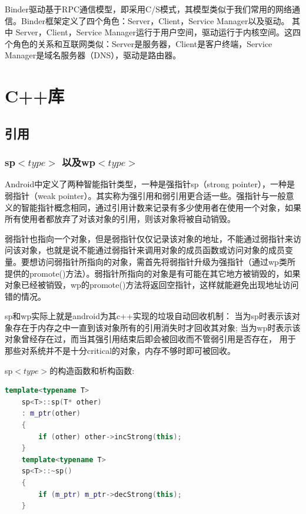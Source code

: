 \documentclass[a4paper,11pt]{article}
\begin{document}
\begin{CJK*}{UTF8}{gbsn}
    Binder驱动基于RPC通信模型，即采用C/S模式，其模型类似于我们常用的网络通信。Binder框架定义了四个角色：Server，Client，Service Manager以及驱动。
    其中 Server，Client，Service Manager运行于用户空间，驱动运行于内核空间。这四个角色的关系和互联网类似：Server是服务器，Client是客户终端，Service Manager是域名服务器（DNS），驱动是路由器。

\section{C++库}
    \subsection{引用}
    \subsubsection{sp$<type>$ 以及wp$<type>$}
    Android中定义了两种智能指针类型，一种是强指针sp（strong pointer），一种是弱指针（weak pointer）。其实称为强引用和弱引用更合适一些。强指针与一般意义的智能指针概念相同，通过引用计数来记录有多少使用者在使用一个对象，如果所有使用者都放弃了对该对象的引用，则该对象将被自动销毁。

    弱指针也指向一个对象，但是弱指针仅仅记录该对象的地址，不能通过弱指针来访问该对象，也就是说不能通过弱指针来调用对象的成员函数或访问对象的成员变量。要想访问弱指针所指向的对象，需首先将弱指针升级为强指针（通过wp类所提供的promote()方法）。弱指针所指向的对象是有可能在其它地方被销毁的，如果对象已经被销毁，wp的promote()方法将返回空指针，这样就能避免出现地址访问错的情况。

    sp和wp实际上就是android为其c++实现的垃圾自动回收机制：%
    当为sp时表示该对象存在于内存之中一直到该对象所有的引用消失时才回收其对象;%
    当为wp时表示该对象曾经存在过，而当其强引用结束后即会被回收而不管弱引用是否存在，%
    用于那些对系统并不是十分critical的对象，内存不够时即可被回收。

    sp$<type>$的构造函数和析构函数:\\
    \begin{lstlisting}[language=C++]
    template<typename T>
    sp<T>::sp(T* other)
    : m_ptr(other)    
    {                
        if (other) other->incStrong(this);
    } 
    template<typename T>
    sp<T>::~sp()
    {
        if (m_ptr) m_ptr->decStrong(this);
    }
    \end{lstlisting}


\end{CJK*}
\end{document}
